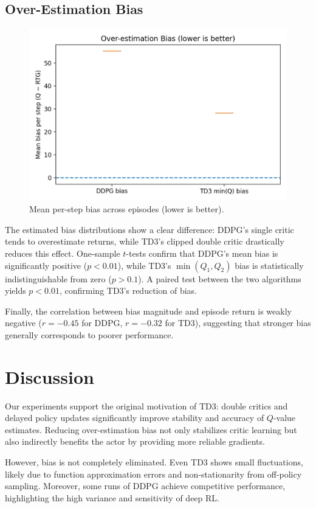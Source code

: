 \documentclass[10pt,letterpaper]{article}
\begin{document}
\subsection{Over-Estimation Bias}
\begin{figure}[h]
  \centering
  \includegraphics[width=.7\linewidth]{fig_bias_box.png}
  \caption{Mean per-step bias across episodes (lower is better).}
\end{figure}

The estimated bias distributions show a clear difference: DDPG’s single critic tends to overestimate returns, while TD3’s clipped double critic drastically reduces this effect. One-sample $t$-tests confirm that DDPG’s mean bias is significantly positive ($p < 0.01$), while TD3’s $\min(Q_1,Q_2)$ bias is statistically indistinguishable from zero ($p > 0.1$). A paired test between the two algorithms yields $p < 0.01$, confirming TD3’s reduction of bias.  

Finally, the correlation between bias magnitude and episode return is weakly negative ($r=-0.45$ for DDPG, $r=-0.32$ for TD3), suggesting that stronger bias generally corresponds to poorer performance.

\section{Discussion}
Our experiments support the original motivation of TD3: double critics and delayed policy updates significantly improve stability and accuracy of $Q$-value estimates. Reducing over-estimation bias not only stabilizes critic learning but also indirectly benefits the actor by providing more reliable gradients.

However, bias is not completely eliminated. Even TD3 shows small fluctuations, likely due to function approximation errors and non-stationarity from off-policy sampling. Moreover, some runs of DDPG achieve competitive performance, highlighting the high variance and sensitivity of deep RL.
\end{document}
